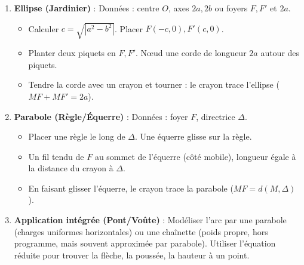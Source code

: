\documentclass[11pt]{article}
\begin{document}
\begin{methode}
    \begin{enumerate}
        \item \textbf{Ellipse (Jardinier)} : Données : centre $O$, axes $2a, 2b$ ou foyers $F,F'$ et $2a$.
        \begin{itemize}
            \item Calculer $c = \sqrt{|a^2-b^2|}$. Placer $F(-c,0), F'(c,0)$.
            \item Planter deux piquets en $F, F'$. Nœud une corde de longueur $2a$ autour des piquets.
            \item Tendre la corde avec un crayon et tourner : le crayon trace l'ellipse ($MF+MF'=2a$).
        \end{itemize}
        \item \textbf{Parabole (Règle/Équerre)} : Données : foyer $F$, directrice $\Delta$.
        \begin{itemize}
            \item Placer une règle le long de $\Delta$. Une équerre glisse sur la règle.
            \item Un fil tendu de $F$ au sommet de l'équerre (côté mobile), longueur égale à la distance du crayon à $\Delta$.
            \item En faisant glisser l'équerre, le crayon trace la parabole ($MF = d(M,\Delta)$).
        \end{itemize}
        \item \textbf{Application intégrée (Pont/Voûte)} : Modéliser l'arc par une parabole (charges uniformes horizontales) ou une chaînette (poids propre, hors programme, mais souvent approximée par parabole). Utiliser l'équation réduite pour trouver la flèche, la poussée, la hauteur à un point.
    \end{enumerate}
\end{methode}
\end{document}
